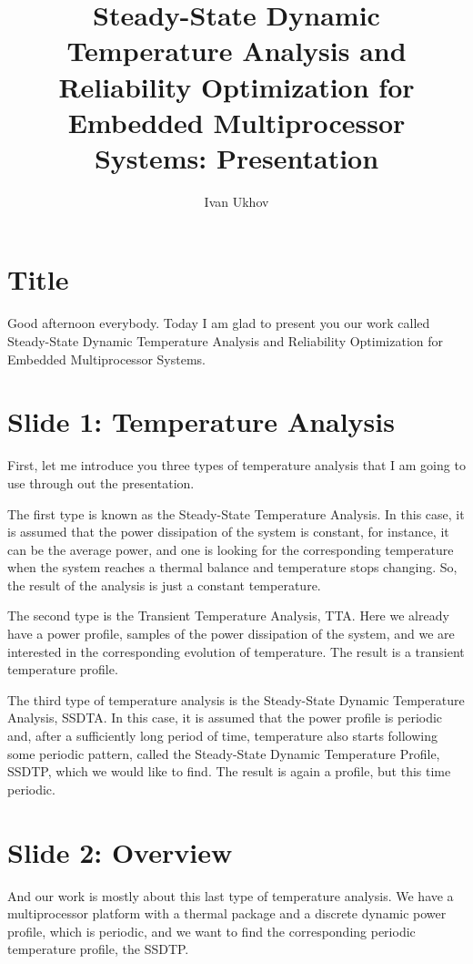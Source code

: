 \documentclass[11pt,a4paper]{article}
\title{Steady-State Dynamic Temperature Analysis and Reliability Optimization for Embedded Multiprocessor Systems: Presentation}
\author{Ivan Ukhov}
\begin{document}
\maketitle

\section{Title}
Good afternoon everybody. Today I am glad to present you our work called Steady-State Dynamic Temperature Analysis and Reliability Optimization for Embedded Multiprocessor Systems.

\section{Slide 1: Temperature Analysis}
First, let me introduce you three types of temperature analysis that I am going to use through out the presentation.

The first type is known as the Steady-State Temperature Analysis. In this case, it is assumed that the power dissipation of the system is constant, for instance, it can be the average power, and one is looking for the corresponding temperature when the system reaches a thermal balance and temperature stops changing. So, the result of the analysis is just a constant temperature.

The second type is the Transient Temperature Analysis, TTA. Here we already have a power profile, samples of the power dissipation of the system, and we are interested in the corresponding evolution of temperature. The result is a transient temperature profile.

The third type of temperature analysis is the Steady-State Dynamic Temperature Analysis, SSDTA. In this case, it is assumed that the power profile is periodic and, after a sufficiently long period of time, temperature also starts following some periodic pattern, called the Steady-State Dynamic Temperature Profile, SSDTP, which we would like to find. The result is again a profile, but this time periodic.

\section{Slide 2: Overview}
And our work is mostly about this last type of temperature analysis. We have a multiprocessor platform with a thermal package and a discrete dynamic power profile, which is periodic, and we want to find the corresponding periodic temperature profile, the SSDTP.
\end{document}
